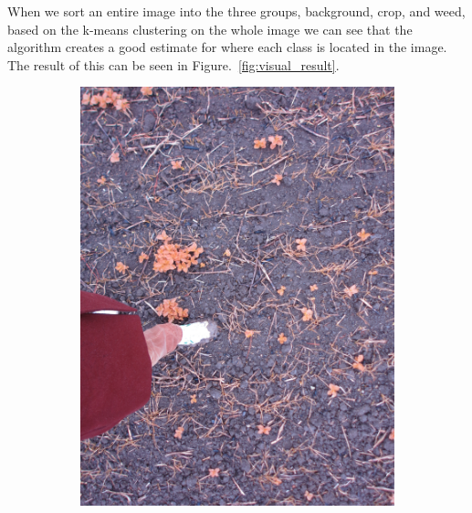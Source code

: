 When we sort an entire image into the three groups, background, crop, and weed, based on the k-means clustering on the whole image we can see that the algorithm creates a good estimate for where each class is located in the image. The result of this can be seen in Figure.~\ref{fig:visual_result}.

\begin{figure}[H]
    \centering
    \captionsetup[subfigure]{justification=centering}
    \begin{subfigure}[b]{0.49\textwidth}
        \centering
        \includegraphics[width=\textwidth]{./figure/result/images/img_orig.jpg}
    \end{subfigure}
    \begin{subfigure}[b]{0.49\textwidth}
        \centering

\end{subfigure}
\end{figure}
